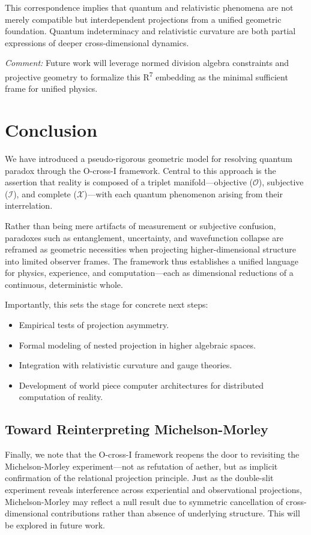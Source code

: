 \documentclass{article}
\begin{document}
This correspondence implies that quantum and relativistic phenomena are not merely compatible but interdependent projections from a unified geometric foundation. Quantum indeterminacy and relativistic curvature are both partial expressions of deeper cross-dimensional dynamics.

\textit{Comment:} Future work will leverage normed division algebra constraints and projective geometry to formalize this R\textsuperscript{7} embedding as the minimal sufficient frame for unified physics.

\section{Conclusion}

We have introduced a pseudo-rigorous geometric model for resolving quantum paradox through the O-cross-I framework. Central to this approach is the assertion that reality is composed of a triplet manifold—objective ($\mathcal{O}$), subjective ($\mathcal{I}$), and complete ($\mathcal{X}$)—with each quantum phenomenon arising from their interrelation.

Rather than being mere artifacts of measurement or subjective confusion, paradoxes such as entanglement, uncertainty, and wavefunction collapse are reframed as geometric necessities when projecting higher-dimensional structure into limited observer frames. The framework thus establishes a unified language for physics, experience, and computation—each as dimensional reductions of a continuous, deterministic whole.

Importantly, this sets the stage for concrete next steps:
\begin{itemize}
    \item Empirical tests of projection asymmetry.
    \item Formal modeling of nested projection in higher algebraic spaces.
    \item Integration with relativistic curvature and gauge theories.
    \item Development of world piece computer architectures for distributed computation of reality.
\end{itemize}

\subsection*{Toward Reinterpreting Michelson-Morley}
Finally, we note that the O-cross-I framework reopens the door to revisiting the Michelson-Morley experiment—not as refutation of aether, but as implicit confirmation of the relational projection principle. Just as the double-slit experiment reveals interference across experiential and observational projections, Michelson-Morley may reflect a null result due to symmetric cancellation of cross-dimensional contributions rather than absence of underlying structure. This will be explored in future work.
\end{document}
